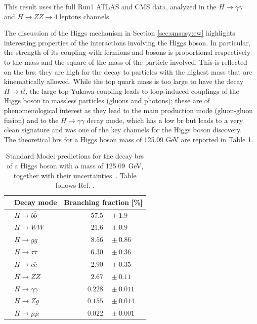 \noindent This result uses the full Run1 ATLAS and CMS data, analyzed in the $H \rightarrow \gamma \gamma$ and $H \rightarrow ZZ \rightarrow 4 \; \mathrm{leptons}$ channels.


The discussion of the Higgs mechanism in Section \ref{sec:smsusy:ew} highlights interesting properties of the interactions involving the Higgs boson. In particular, the strength of its coupling with fermions and bosons is proportional respectively to the mass and the square of the mass of the particle involved. 
This is reflected on the \glspl{br}: they are high for the decay to particles with the highest mass that are kinematically allowed.
While the top quark mass is too large to have the decay $H \to t\bar{t}$, the large top Yukawa coupling leads to loop-induced couplings of the Higgs boson to massless particles (gluons and photons); these are of phenomenological interest as they lead to the main production mode (gluon-gluon fusion) and to the $H \to \gamma \gamma$ decay mode, which has a low \gls{br} but leads to a very clean signature and was one of the key channels for the Higgs boson discovery. 
The theoretical \glspl{br} for a Higgs boson mass of 125.09 GeV are reported in Table \ref{tab:SMBranchingFractions}. 

\begin{table}[htbp]
\begin{center}
\begin{tabular}{clcr@{\hskip 0.4ex}l} \\ 
\hline
 &    Decay mode &\multicolumn{3}{c}{Branching fraction [\%]}  \\  \hline
 \hline
 &     $H \rightarrow b\bar{b}$       & &   $57.5$&${}\pm 1.9$    \\
 &     $H \rightarrow WW$       & &   $21.6$&${}\pm 0.9$   \\
 &     $H \rightarrow gg$       & &   $8.56$&${}\pm 0.86$  \\
 &     $H \rightarrow \tau \bar{\tau}$       & &   $6.30$&${}\pm 0.36$  \\
 &     $H \rightarrow c\bar{c}$       & &   $2.90$&${}\pm 0.35$  \\
 &     $H \rightarrow ZZ$       & &   $2.67$&${}\pm 0.11$  \\
 &     $H \rightarrow \gamma \gamma$       & &   $0.228$&${}\pm 0.011$  \\
 &     $H \rightarrow Zg$       & &   $0.155$&${}\pm 0.014$  \\
 &     $H \rightarrow \mu \bar{\mu}$       & &   ~~$0.022$&${}\pm 0.001$  \\ 
\hline
\end{tabular} 
\end{center}
\caption{Standard Model predictions for the decay \glspl{br} of a Higgs boson with a mass of 125.09~GeV, together with their uncertainties~\cite{Heinemeyer:2013tqa}. Table follows Ref. \cite{Khachatryan:2016vau}.}
\label{tab:SMBranchingFractions}
\end{table} 

